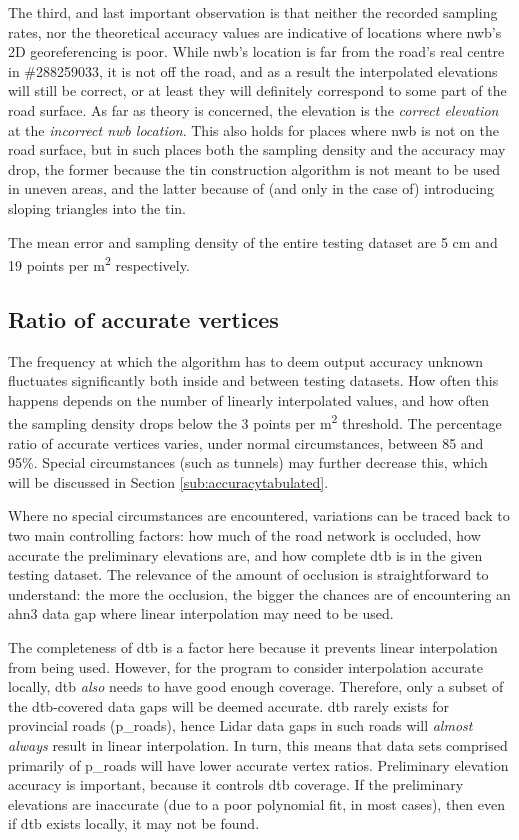 The third, and last important observation is that neither the recorded sampling rates, nor the theoretical accuracy values are indicative of locations where \ac{nwb}'s 2D georeferencing is poor. While \ac{nwb}'s location is far from the road's real centre in \#288259033, it is not off the road, and as a result the interpolated elevations will still be correct, or at least they will definitely correspond to some part of the road surface. As far as theory is concerned, the elevation is the \textit{correct elevation} at the \textit{incorrect \ac{nwb} location}. This also holds for places where \ac{nwb} is not on the road surface, but in such places both the sampling density and the accuracy may drop, the former because the \ac{tin} construction algorithm is not meant to be used in uneven areas, and the latter because of (and only in the case of) introducing sloping triangles into the \ac{tin}.

The mean error and sampling density of the entire testing dataset are 5 cm and 19 points per m\textsuperscript{2} respectively.

\subsection{Ratio of accurate vertices}
\label{sub:completeness}

The frequency at which the algorithm has to deem output accuracy unknown fluctuates significantly both inside and between testing datasets. How often this happens depends on the number of linearly interpolated values, and how often the sampling density drops below the 3 points per m\textsuperscript{2} threshold. The percentage ratio of accurate vertices varies, under normal circumstances, between 85 and 95\%. Special circumstances (such as tunnels) may further decrease this, which will be discussed in Section \ref{sub:accuracytabulated}.

Where no special circumstances are encountered, variations can be traced back to two main controlling factors: how much of the road network is occluded, how accurate the preliminary elevations are, and how complete \ac{dtb} is in the given testing dataset. The relevance of the amount of occlusion is straightforward to understand: the more the occlusion, the bigger the chances are of encountering an \ac{ahn3} data gap where linear interpolation may need to be used.

The completeness of \ac{dtb} is a factor here because it prevents linear interpolation from being used. However, for the program to consider interpolation accurate locally, \ac{dtb} \textit{also} needs to have good enough coverage. Therefore, only a subset of the \ac{dtb}-covered data gaps will be deemed accurate. \ac{dtb} rarely exists for provincial roads (\ac{p_roads}), hence Lidar data gaps in such roads will \textit{almost always} result in linear interpolation. In turn, this means that data sets comprised primarily of \ac{p_roads} will have lower accurate vertex ratios. Preliminary elevation accuracy is important, because it controls \ac{dtb} coverage. If the preliminary elevations are inaccurate (due to a poor polynomial fit, in most cases), then even if \ac{dtb} exists locally, it may not be found.

